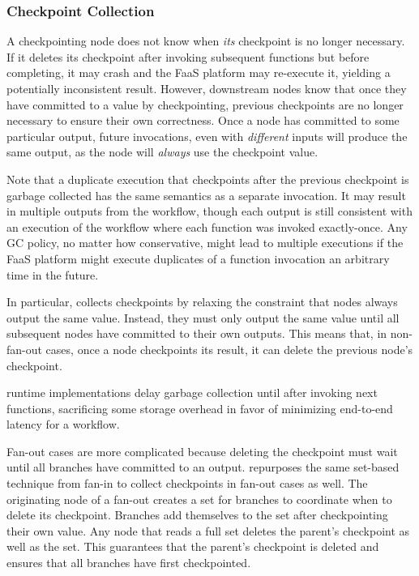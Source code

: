 \subsubsection{Checkpoint Collection}

A checkpointing node does not know when \emph{its} checkpoint is no longer
necessary.  If it deletes its checkpoint after invoking subsequent functions but
before completing, it may crash and the FaaS platform may re-execute it,
yielding a potentially inconsistent result. However, downstream nodes know that
once they have committed to a value by checkpointing, previous checkpoints are
no longer necessary to ensure their own correctness. Once a node has committed
to some particular output, future invocations, even with \emph{different} inputs
will produce the same output, as the node will \emph{always} use the checkpoint
value.

Note that a duplicate execution that checkpoints after the previous checkpoint
is garbage collected has the same semantics as a separate invocation. It may
result in multiple outputs from the workflow, though each output is still
consistent with an execution of the workflow where each function was invoked
exactly-once. Any GC policy, no matter how conservative, might lead to
multiple executions if the FaaS platform might execute duplicates of a
function invocation an arbitrary time in the future.

In particular, \name{} collects checkpoints by relaxing the constraint that
nodes always output the same value. Instead, they must only output the same
value until all subsequent nodes have committed to their own outputs. This
means that, in non-fan-out cases, once a node checkpoints its result, it can
delete the previous node's checkpoint.

\name{} runtime implementations delay garbage collection until after invoking
next functions, sacrificing some storage overhead in favor of minimizing
end-to-end latency for a workflow.

Fan-out cases are more complicated because deleting the checkpoint must wait
until all branches have committed to an output. \name{} repurposes the same
set-based technique from fan-in to collect checkpoints in fan-out cases as
well. The originating node of a fan-out creates a set for branches to
coordinate when to delete its checkpoint. Branches add themselves to the set
after checkpointing their own value. Any node that reads a full set deletes
the parent's checkpoint as well as the set. This guarantees that the parent's
checkpoint is deleted and ensures that all branches have first checkpointed.

